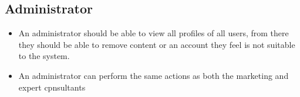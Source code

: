 \documentclass[10pt]{article}
\begin{document}
\subsection*{Administrator}
\begin{itemize}
\item An administrator should be able to view all profiles of all users, from there they should be able to remove content or an account they feel is not suitable to the system.
\item An administrator can perform the same actions as both the marketing and expert cpnsultants
\end{itemize}
\end{document}
